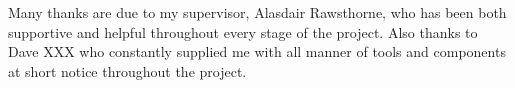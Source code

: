 Many thanks are due to my supervisor, Alasdair Rawsthorne, who has been both
supportive and helpful throughout every stage of the project. Also thanks to
Dave XXX who constantly supplied me with all manner of tools and components at
short notice throughout the project.
